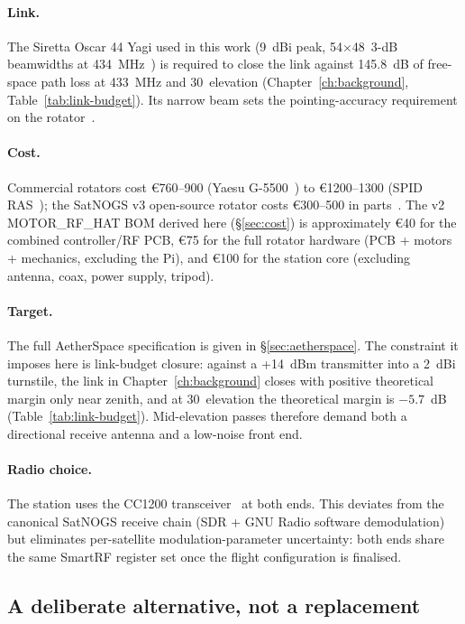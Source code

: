 \paragraph{Link.}
The Siretta Oscar 44 Yagi used in this work (9~dBi peak, 54\degree$\times$48\degree\ 3-dB beamwidths at 434~MHz~\cite{siretta-oscar44}) is required to close the link against 145.8~dB of free-space path loss at 433~MHz and 30\degree\ elevation (Chapter~\ref{ch:background}, Table~\ref{tab:link-budget}). Its narrow beam sets the pointing-accuracy requirement on the rotator~\cite{stutzman2012antenna}.

\paragraph{Cost.}
Commercial rotators cost \euro{}760--900 (Yaesu G-5500~\cite{yaesu-g5500}) to \euro{}1200--1300 (SPID RAS~\cite{rfham-spid}); the SatNOGS v3 open-source rotator costs \euro{}300--500 in parts~\cite{satnogs-v3, satnogs-v3-bom}. The v2 MOTOR\_RF\_HAT BOM derived here (\S\ref{sec:cost}) is approximately \euro{}40 for the combined controller/RF PCB, \euro{}75 for the full rotator hardware (PCB + motors + mechanics, excluding the Pi), and \euro{}100 for the station core (excluding antenna, coax, power supply, tripod).

\paragraph{Target.}
The full AetherSpace specification is given in \S\ref{sec:aetherspace}. The constraint it imposes here is link-budget closure: against a +14~dBm transmitter into a 2~dBi turnstile, the link in Chapter~\ref{ch:background} closes with positive theoretical margin only near zenith, and at 30\degree\ elevation the theoretical margin is $-5.7$~dB (Table~\ref{tab:link-budget}). Mid-elevation passes therefore demand both a directional receive antenna and a low-noise front end.

\paragraph{Radio choice.}
The station uses the CC1200 transceiver~\cite{cc1200} at both ends. This deviates from the canonical SatNOGS receive chain (SDR + GNU Radio software demodulation) but eliminates per-satellite modulation-parameter uncertainty: both ends share the same SmartRF register set once the flight configuration is finalised.

\subsection*{A deliberate alternative, not a replacement}

